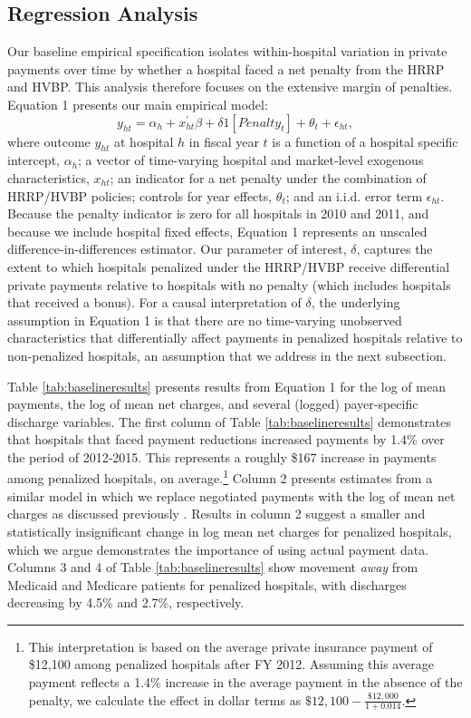 \documentclass[12pt]{article}
\begin{document}
\subsection{Regression Analysis}
\label{sec:initial}
Our baseline empirical specification isolates within-hospital variation in private payments over time by whether a hospital faced a net penalty from the HRRP and HVBP. This analysis therefore focuses on the extensive margin of penalties.  Equation 1 presents our main empirical model:
\begin{equation}
\label{eq: reg}
y_{ht} = \alpha_{h} + x^{'}_{ht}\beta + \delta1[Penalty_{t}]  + \theta_{t}  +  \epsilon_{ht},
\end{equation}
where outcome $y_{ht}$ at hospital $h$ in fiscal year $t$ is a function of a hospital specific intercept, $\alpha_{h}$; a vector of time-varying hospital and market-level exogenous characteristics, $x_{ht}$; an indicator for a net penalty under the combination of HRRP/HVBP policies; controls for year effects, $\theta_t$; and an i.i.d. error term $\epsilon_{ht}$.  Because the penalty indicator is zero for all hospitals in 2010 and 2011, and because we include hospital fixed effects, Equation 1 represents an unscaled difference-in-differences estimator. Our parameter of interest, $\delta$, captures the extent to which hospitals penalized under the HRRP/HVBP receive differential private payments relative to hospitals with no penalty (which includes hospitals that received a bonus).  For a causal interpretation of $\delta$, the underlying assumption in Equation 1 is that there are no time-varying unobserved characteristics that differentially affect payments in penalized hospitals relative to non-penalized hospitals, an assumption that we address in the next subsection.

Table \ref{tab:baselineresults} presents results from Equation 1 for the log of mean payments, the log of mean net charges, and several (logged) payer-specific discharge variables. The first column of Table \ref{tab:baselineresults} demonstrates that hospitals that faced payment reductions increased payments by 1.4\% over the period of 2012-2015.  This represents a roughly \$167 increase in payments among penalized hospitals, on average.\footnote{This interpretation is based on the average private insurance payment of \$12,100 among penalized hospitals after FY 2012. Assuming this average payment reflects a 1.4\% increase in the average payment in the absence of the penalty, we calculate the effect in dollar terms as $\$12,100 - \frac{\$12,000}{1+0.014}$.} Column 2 presents estimates from a similar model in which we replace negotiated payments with the log of mean net charges as discussed previously \citep{dafny2009,lewis2015,schmitt2017,dranove2017}. Results in column 2 suggest a smaller and statistically insignificant change in log mean net charges for penalized hospitals, which we argue demonstrates the importance of using actual payment data.  Columns 3 and 4 of Table \ref{tab:baselineresults} show movement \textit{away} from Medicaid and Medicare patients for penalized hospitals, with discharges decreasing by 4.5\% and 2.7\%, respectively.
\end{document}
